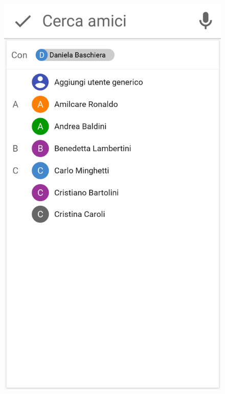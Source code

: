 \begin{figure}[H]
\begin{minipage}{.49\textwidth}
		\includegraphics[width=\textwidth]{img/wireframe/aggiungi_utente_daniela.png}
	\end{minipage}
\end{figure}
